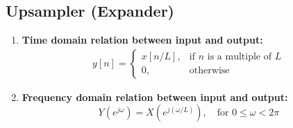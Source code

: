 \documentclass{article}
\begin{document}
\subsection{Upsampler (Expander)}
\begin{enumerate}
    \item \textbf{Time domain relation between input and output:}
    \begin{align*}
    y[n] = \begin{cases}
    x[n/L], & \text{if } n \text{ is a multiple of } L \\
    0, & \text{otherwise}
\end{cases}
       \end{align*}  
    \item \textbf{Frequency domain relation between input and output:}
    \[
    Y(e^{j\omega}) = X(e^{j(\omega/L)}), \quad \text{for } 0 \leq \omega < 2\pi
    \]
\end{enumerate}
\end{document}

